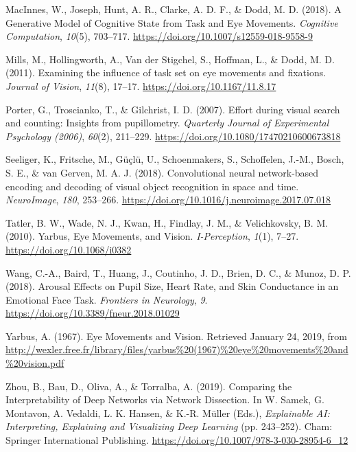 \documentclass[
  english,
  man,floatsintext]{apa6}
\begin{document}
\leavevmode\hypertarget{ref-macinnesjosephGenerativeModelCognitive2018}{}%
MacInnes, W., Joseph, Hunt, A. R., Clarke, A. D. F., \& Dodd, M. D. (2018). A Generative Model of Cognitive State from Task and Eye Movements. \emph{Cognitive Computation}, \emph{10}(5), 703--717. \url{https://doi.org/10.1007/s12559-018-9558-9}

\leavevmode\hypertarget{ref-millsExaminingInfluenceTask2011}{}%
Mills, M., Hollingworth, A., Van der Stigchel, S., Hoffman, L., \& Dodd, M. D. (2011). Examining the influence of task set on eye movements and fixations. \emph{Journal of Vision}, \emph{11}(8), 17--17. \url{https://doi.org/10.1167/11.8.17}

\leavevmode\hypertarget{ref-porterEffortVisualSearch2007}{}%
Porter, G., Troscianko, T., \& Gilchrist, I. D. (2007). Effort during visual search and counting: Insights from pupillometry. \emph{Quarterly Journal of Experimental Psychology (2006)}, \emph{60}(2), 211--229. \url{https://doi.org/10.1080/17470210600673818}

\leavevmode\hypertarget{ref-seeligerConvolutionalNeuralNetworkbased2018}{}%
Seeliger, K., Fritsche, M., Güçlü, U., Schoenmakers, S., Schoffelen, J.-M., Bosch, S. E., \& van Gerven, M. A. J. (2018). Convolutional neural network-based encoding and decoding of visual object recognition in space and time. \emph{NeuroImage}, \emph{180}, 253--266. \url{https://doi.org/10.1016/j.neuroimage.2017.07.018}

\leavevmode\hypertarget{ref-tatlerYarbusEyeMovements2010}{}%
Tatler, B. W., Wade, N. J., Kwan, H., Findlay, J. M., \& Velichkovsky, B. M. (2010). Yarbus, Eye Movements, and Vision. \emph{I-Perception}, \emph{1}(1), 7--27. \url{https://doi.org/10.1068/i0382}

\leavevmode\hypertarget{ref-wangArousalEffectsPupil2018}{}%
Wang, C.-A., Baird, T., Huang, J., Coutinho, J. D., Brien, D. C., \& Munoz, D. P. (2018). Arousal Effects on Pupil Size, Heart Rate, and Skin Conductance in an Emotional Face Task. \emph{Frontiers in Neurology}, \emph{9}. \url{https://doi.org/10.3389/fneur.2018.01029}

\leavevmode\hypertarget{ref-yarbusEyeMovementsVision1967}{}%
Yarbus, A. (1967). Eye Movements and Vision. Retrieved January 24, 2019, from \url{http://wexler.free.fr/library/files/yarbus\%20(1967)\%20eye\%20movements\%20and\%20vision.pdf}

\leavevmode\hypertarget{ref-zhouComparingInterpretabilityDeep2019}{}%
Zhou, B., Bau, D., Oliva, A., \& Torralba, A. (2019). Comparing the Interpretability of Deep Networks via Network Dissection. In W. Samek, G. Montavon, A. Vedaldi, L. K. Hansen, \& K.-R. Müller (Eds.), \emph{Explainable AI: Interpreting, Explaining and Visualizing Deep Learning} (pp. 243--252). Cham: Springer International Publishing. \url{https://doi.org/10.1007/978-3-030-28954-6_12}
\end{document}
